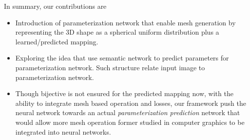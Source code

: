 In summary, our contributions are
\begin{itemize}
	\item  Introduction of parameterization network that enable mesh generation by representing the 3D shape as a spherical uniform distribution plus a learned/predicted mapping.
	\item  Exploring the idea that use semantic network to predict parameters for parameterization network. Such structure relate input image to parameterization network.
	\item Though bijective is not ensured for the predicted mapping now, with the ability to integrate mesh based operation and losses, our framework push the neural network towards an actual \emph{parameterization prediction} network that would allow more mesh operation former studied in computer graphics to be integrated into neural networks.
\end{itemize}          

